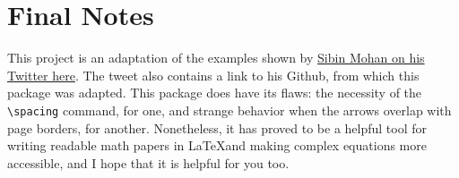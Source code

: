 \documentclass{article} %
\newcommand{\tbs}{\textbackslash} %
\newcommand{\ttt}{\texttt} %
\begin{document}
\section{Final Notes}
This project is an adaptation of the examples shown by \href{https://twitter.com/sibinmohan/status/1480583840858996743}{Sibin Mohan on his Twitter here}. The tweet also contains a link to his Github, from which this package was adapted. This package does have its flaws: the necessity of the \ttt{\tbs spacing} command, for one, and strange behavior when the arrows overlap with page borders, for another. Nonetheless, it has proved to be a helpful tool for writing readable math papers in \LaTeX and making complex equations more accessible, and I hope that it is helpful for you too.
\end{document}
